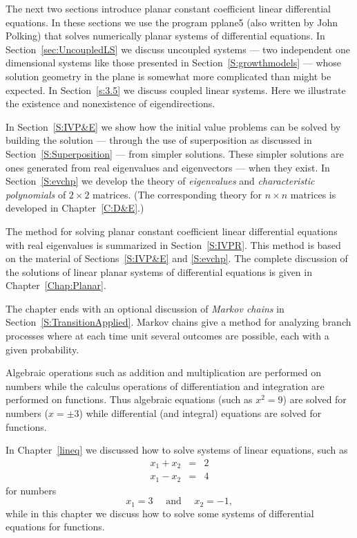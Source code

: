 The next two sections introduce planar constant coefficient linear
differential equations.  In these sections we use the program {\sf pplane5}
(also written by John Polking) that solves numerically planar systems of
differential equations.  In Section~\ref{sec:UncoupledLS} we discuss 
uncoupled systems --- two independent one dimensional systems like those 
presented in Section~\ref{S:growthmodels} --- whose solution geometry in the 
plane is somewhat more complicated than might be expected.  In 
Section~\ref{s:3.5} we discuss coupled linear systems.  Here we
illustrate the existence and nonexistence of eigendirections.

In Section~\ref{S:IVP&E} we show how the initial value problems can be solved 
by building the solution --- through the use of superposition as discussed in 
Section~\ref{S:Superposition} --- from simpler solutions.  These simpler
solutions are ones generated from real eigenvalues and eigenvectors
--- when they exist.  In Section~\ref{S:evchp} we develop the theory of  
{\em eigenvalues\/} and {\em characteristic polynomials\/} of $2\times 2$ 
matrices.  (The corresponding theory for $n\times n$ matrices is developed in 
Chapter~\ref{C:D&E}.)

The method for solving planar constant coefficient linear differential 
equations with real eigenvalues is summarized in Section~\ref{S:IVPR}.  This 
method is based on the material of Sections~\ref{S:IVP&E} and \ref{S:evchp}.  
The complete discussion of the solutions of linear planar systems of 
differential equations is given in Chapter~\ref{Chap:Planar}.

The chapter ends with an optional discussion of {\em Markov chains\/} in 
Section~\ref{S:TransitionApplied}.  Markov chains give a method for 
analyzing branch processes where at each time unit several outcomes are 
possible, each with a given probability.

  \label{S:growthmodels}

Algebraic operations such as addition and multiplication are
performed on numbers while the calculus operations of
differentiation and integration are performed on functions.
Thus algebraic equations (such as $x^2=9$) are solved for
numbers ($x=\pm 3$) while differential (and integral) equations
are solved for functions.

In Chapter~\ref{lineq} we discussed how to solve systems of
linear equations, such as
\begin{eqnarray*}
x_1 + x_2 & = & 2 \\
x_1 - x_2 & = & 4
\end{eqnarray*}
for numbers
\[
x_1=3 \quad \mbox{ and } \quad x_2=-1,
\]
while in this chapter we discuss how to solve some systems of
differential equations for functions.

